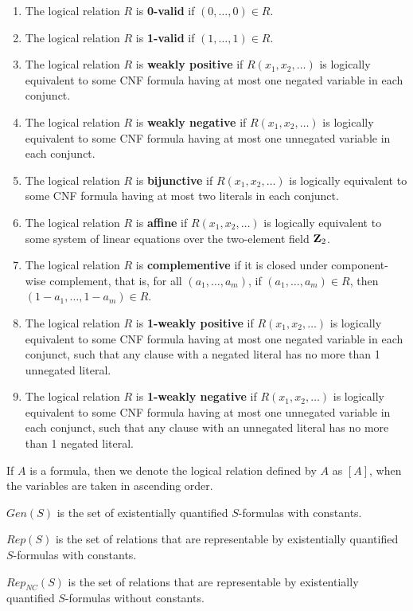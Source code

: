 \begin{definition}\label{def:affine}

\begin{enumerate}
\item
The logical relation $R$ is {\bf 0-valid} if $(0, \ldots, 0) \in R$.
\item
The logical relation $R$ is {\bf 1-valid} if $(1, \ldots, 1) \in R$.
\item
The logical relation $R$ is {\bf weakly positive} if
$R(x_1,x_2,\ldots)$ is logically equivalent to some CNF formula having at
most one negated variable in each conjunct.
\item
The logical relation $R$ is {\bf weakly negative} if
$R(x_1,x_2,\ldots)$ is logically equivalent to some CNF formula having at
most one unnegated variable in each conjunct.
\item
The logical relation $R$ is {\bf bijunctive} if
$R(x_1,x_2,\ldots)$ is logically equivalent to some CNF formula having at
most two literals in each conjunct.
\item
The logical relation $R$ is {\bf affine} if $R(x_1,x_2,\ldots)$ is logically 
equivalent to some system of linear equations over the two-element field 
${\bf Z}_2$.
\item
The logical relation $R$ is {\bf complementive} 
if it is closed under component-wise
complement, that is, for all $(a_1,\ldots,a_m)$, if $(a_1,\ldots,a_m) \in R$, 
then $(1-a_1,\ldots,1-a_m) \in R$.
\item
The logical relation $R$ is {\bf 1-weakly positive} if
$R(x_1,x_2,\ldots)$ is logically equivalent to some CNF formula having at
most one negated variable in each conjunct, such that any clause with
a negated literal has no more than 1 unnegated literal.
\item
The logical relation $R$ is {\bf 1-weakly negative} if
$R(x_1,x_2,\ldots)$ is logically equivalent to some CNF formula having at
most one unnegated variable in each conjunct, such that any clause with
an unnegated literal has no more than 1 negated literal.
\end{enumerate}
\end{definition}



\begin{definition}\label{def:rep}
If $A$ is a formula, then we denote the 
logical relation defined by $A$ as {\bf $[A]$},
when the variables are taken in ascending order.

{\sf $Gen(S)$} is the set of existentially quantified $S$-formulas with
constants.

{\sf $Rep(S)$} is the set of relations that are representable by existentially 
quantified $S$-formulas with constants.

{\sf $Rep_{NC}(S)$} is the set of relations that are 
representable by existentially quantified $S$-formulas without constants.
\end{definition}







